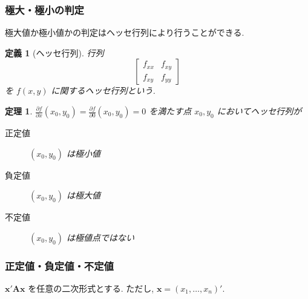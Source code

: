 \documentclass{jsarticle}
\theoremstyle{plain}
\newtheorem{theo}{定理}[section]
\newtheorem{defi}{定義}[section]
\begin{document}

  \subsubsection{極大・極小の判定}
  極大値か極小値かの判定はヘッセ行列により行うことができる.

  \begin{defi}[ヘッセ行列]
    行列
    \begin{equation*}
      \left[
        \begin{array}{cc}
          f_{xx} & f_{xy} \\
          f_{xy} & f_{yy}
        \end{array}
      \right]
    \end{equation*}
    を $f(x, y)$ に関するヘッセ行列という.
  \end{defi}

  \begin{theo}
    $\frac{\partial f}{\partial x}(x_0, y_0) = \frac{\partial f}{\partial 0}(x_0, y_0) = 0$ を満たす点 $x_0, y_0$ においてヘッセ行列が\footnotemark
    \begin{description}
      \item[正定値] $(x_0, y_0)$ は極小値
      \item[負定値] $(x_0, y_0)$ は極大値
      \item[不定値] $(x_0, y_0)$ は極値点ではない
    \end{description}
  \end{theo}

  \subsubsection{正定値・負定値・不定値}
  $\bm{x}'\bm{A}\bm{x}$ を任意の二次形式とする. ただし, $\bm{x} = (x_1, \ldots, x_n)'$.
  
\end{document}
